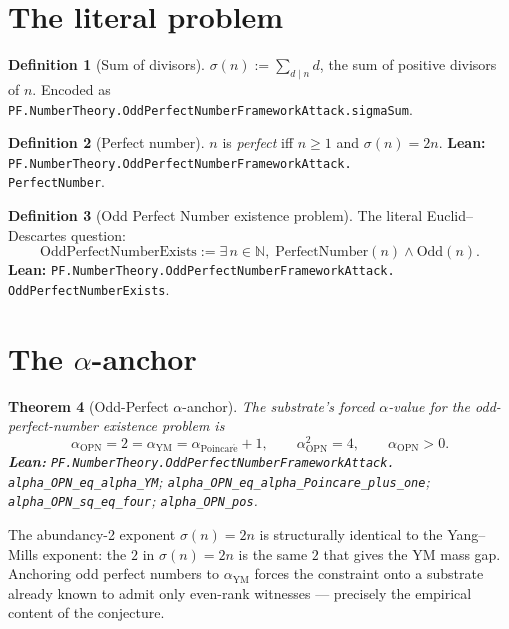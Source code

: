 \documentclass[11pt,a4paper]{article}
\theoremstyle{plain}
\newtheorem{theorem}{Theorem}[section]
\theoremstyle{definition}
\newtheorem{definition}[theorem]{Definition}
\begin{document}
\section{The literal problem}

\begin{definition}[Sum of divisors]
\label{def:sigma}
$\sigma(n) := \sum_{d \mid n} d$, the sum of positive divisors of
$n$. Encoded as
\texttt{PF.NumberTheory.OddPerfectNumberFrameworkAttack.sigmaSum}.
\end{definition}

\begin{definition}[Perfect number]
\label{def:perfect}
$n$ is \emph{perfect} iff $n \ge 1$ and $\sigma(n) = 2n$.
\textbf{Lean:}
\texttt{PF.NumberTheory.OddPerfectNumberFrameworkAttack.\\PerfectNumber}.
\end{definition}

\begin{definition}[Odd Perfect Number existence problem]
\label{def:opn}
The literal Euclid--Descartes question:
\[
\mathrm{OddPerfectNumberExists} := \exists\, n \in \mathbb{N},\;
\mathrm{PerfectNumber}(n) \wedge \mathrm{Odd}(n).
\]
\textbf{Lean:}
\texttt{PF.NumberTheory.OddPerfectNumberFrameworkAttack.\\
OddPerfectNumberExists}.
\end{definition}

\section{The $\alpha$-anchor}

\begin{theorem}[Odd-Perfect $\alpha$-anchor]
\label{thm:alpha-opn}
The substrate's forced $\alpha$-value for the odd-perfect-number
existence problem is
\[
\alpha_{\mathrm{OPN}} = 2 = \alpha_{\mathrm{YM}}
  = \alpha_{\mathrm{Poincar\acute e}} + 1,
\qquad
\alpha_{\mathrm{OPN}}^{2} = 4,
\qquad
\alpha_{\mathrm{OPN}} > 0.
\]
\textbf{Lean:}
\texttt{PF.NumberTheory.OddPerfectNumberFrameworkAttack.\\
alpha\_OPN\_eq\_alpha\_YM};
\texttt{alpha\_OPN\_eq\_alpha\_Poincare\_plus\_one};
\texttt{alpha\_OPN\_sq\_eq\_four};
\texttt{alpha\_OPN\_pos}.
\end{theorem}

The abundancy-2 exponent $\sigma(n) = 2 n$ is structurally identical
to the Yang--Mills exponent: the $2$ in $\sigma(n) = 2n$ is the
same $2$ that gives the YM mass gap. Anchoring odd perfect numbers
to $\alpha_{\mathrm{YM}}$ forces the constraint onto a substrate
already known to admit only even-rank witnesses --- precisely the
empirical content of the conjecture.
\end{document}
